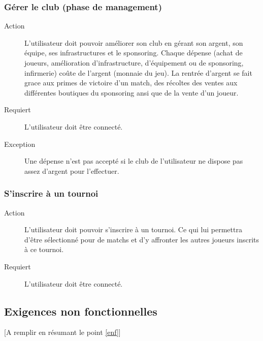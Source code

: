 \documentclass[a4paper]{article}
\begin{document}
\subsubsection{Gérer le club (phase de management)}
\begin{description}
\item[Action] L'\gls{utilisateur} doit pouvoir améliorer son club en gérant son argent, son équipe, ses infrastructures et le sponsoring. Chaque dépense (achat de joueurs, amélioration d'infrastructure, d'équipement ou de sponsoring, infirmerie) coûte de l'argent (monnaie du jeu). La rentrée d'argent se fait grace aux primes de victoire d'un match, des récoltes des ventes aux différentes boutiques du sponsoring ansi que de la vente d'un joueur.
\item[Requiert] L'\gls{utilisateur} doit être connecté.
\item[Exception] Une dépense n'est pas accepté si le club de l'\gls{utilisateur} ne dispose pas assez d'argent pour l'effectuer.
\end{description}

\subsubsection{S'inscrire à un tournoi}
\begin{description}
\item[Action] L'\gls{utilisateur} doit pouvoir s'inscrire à un tournoi.
Ce qui lui permettra d'être sélectionné pour de matchs et d'y affronter les autres joueurs inscrits à ce tournoi.
\item[Requiert] L'\gls{utilisateur} doit être connecté.
\end{description} 


\subsection{Exigences non fonctionnelles}
[A remplir en résumant le point \ref{enf}]

\end{document}
